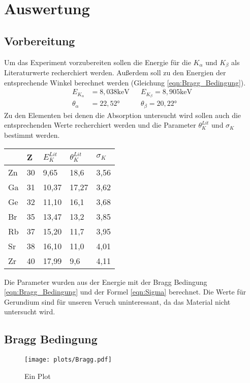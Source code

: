 \section{Auswertung}
\label{sec:Auswertung}
\subsection{Vorbereitung}
Um das Experiment vorzubereiten sollen die Energie für die $K_{\alpha}$ und $K_{\beta}$ als Literaturwerte recherchiert werden.
Außerdem soll zu den Energien der entsprechende Winkel berechnet werden (Gleichung \ref{eqn:Bragg_Bedingung}).
\begin{align}
    E_{K_{\alpha}} &= 8,038 \text{keV} && E_{K_{\beta}} = 8,905 \text{keV} \nonumber \\
    \theta_{\alpha} &= 22,52°    &&      \theta_{\beta} = 20,22° \nonumber
\end{align}
Zu den Elementen bei denen die Absorption untersucht wird sollen auch die entsprechenden Werte recherchiert werden und die Parameter $\theta_K^{Lit}$ und $\sigma_K$ bestimmt werden.
\begin{table}
\centering
\begin{tabular}{lllll}
  & Z & $E_K^{Lit}$ & $\theta_K^{Lit}$ & $\sigma_K$\\
  \toprule
Zn & 30 & 9,65 & 18,6 & 3,56\\
\midrule
Ga & 31 & 10,37 & 17,27 & 3,62\\
\midrule
Ge & 32 & 11,10 & 16,1 & 3,68\\ 
\midrule
Br & 35 & 13,47 & 13,2 & 3,85\\ 
\midrule
Rb & 37 & 15,20 & 11,7 & 3,95\\ 
\midrule
Sr & 38 & 16,10 & 11,0 & 4,01\\
\midrule
Zr & 40 & 17,99 & 9,6 & 4,11\\
\bottomrule
\end{tabular}
\end{table}
Die Parameter wurden aus der Energie mit der Bragg Bedingung \ref{eqn:Bragg_Bedingung} und der Formel \ref{eqn:Sigma} berechnet.
Die Werte für Gerundium sind für unseren Veruch uninteressant, da das Material nicht untersucht wird.
\subsection{Bragg Bedingung}

\begin{figure}
    \centering
    \texttt{[image: plots/Bragg.pdf]}
    \caption{Ein Plot}
    \label{fig:Bragg}
\end{figure}

